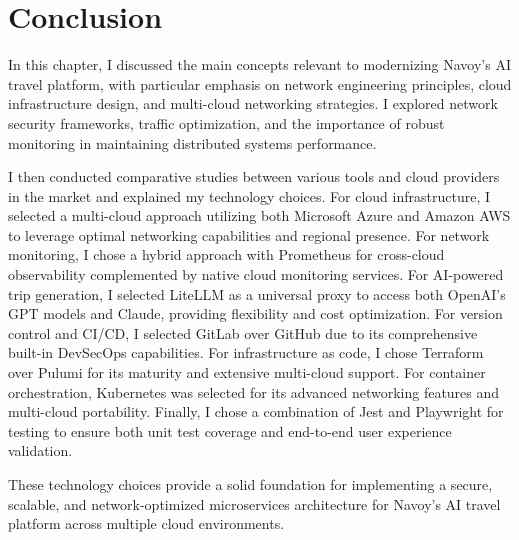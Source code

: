 \setcounter{secnumdepth}{0} %
\section{Conclusion}
In this chapter, I discussed the main concepts relevant to modernizing Navoy's AI travel platform, with particular emphasis on network engineering principles, cloud infrastructure design, and multi-cloud networking strategies. I explored network security frameworks, traffic optimization, and the importance of robust monitoring in maintaining distributed systems performance.

I then conducted comparative studies between various tools and cloud providers in the market and explained my technology choices. For cloud infrastructure, I selected a multi-cloud approach utilizing both Microsoft Azure and Amazon AWS to leverage optimal networking capabilities and regional presence. For network monitoring, I chose a hybrid approach with Prometheus for cross-cloud observability complemented by native cloud monitoring services. For AI-powered trip generation, I selected LiteLLM as a universal proxy to access both OpenAI's GPT models and Claude, providing flexibility and cost optimization. For version control and CI/CD, I selected GitLab over GitHub due to its comprehensive built-in DevSecOps capabilities. For infrastructure as code, I chose Terraform over Pulumi for its maturity and extensive multi-cloud support. For container orchestration, Kubernetes was selected for its advanced networking features and multi-cloud portability. Finally, I chose a combination of Jest and Playwright for testing to ensure both unit test coverage and end-to-end user experience validation.

These technology choices provide a solid foundation for implementing a secure, scalable, and network-optimized microservices architecture for Navoy's AI travel platform across multiple cloud environments.

